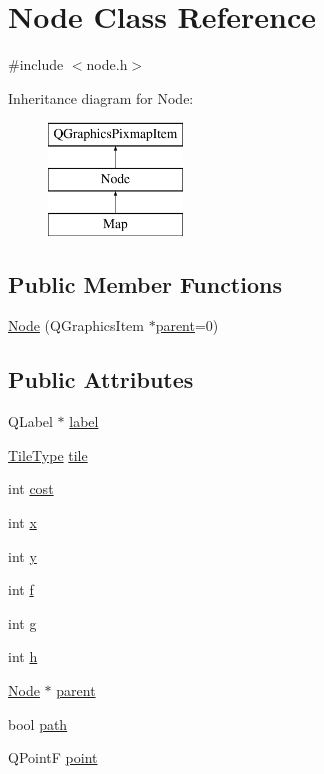 \hypertarget{class_node}{}\section{Node Class Reference}
\label{class_node}


{\ttfamily \#include $<$node.\+h$>$}

Inheritance diagram for Node\+:\begin{figure}[H]
\begin{center}
\leavevmode
\includegraphics[height=3.000000cm]{class_node}
\end{center}
\end{figure}
\subsection*{Public Member Functions}
\begin{DoxyCompactItemize}
\item 
\hyperlink{class_node_a99ae3b67742635b847aff323ddd29b62}{Node} (Q\+Graphics\+Item $\ast$\hyperlink{class_node_ad8184598cdea70e4bbdfd76f2b0f9e85}{parent}=0)
\end{DoxyCompactItemize}
\subsection*{Public Attributes}
\begin{DoxyCompactItemize}
\item 
Q\+Label $\ast$ \hyperlink{class_node_a95d9b57b8efb3807c994314c3ff444b7}{label}
\item 
\hyperlink{node_8h_ac9e486ec80ccfdb28a4f4837d419c9f1}{Tile\+Type} \hyperlink{class_node_a2250e2c1710fb19f15f236ac69563613}{tile}
\item 
int \hyperlink{class_node_aae24f318bd4b6d14270084cec3fc98b5}{cost}
\item 
int \hyperlink{class_node_aff1029a518bdc2651007b8856f958364}{x}
\item 
int \hyperlink{class_node_aa3e5b5240023b4528ae85057b3324202}{y}
\item 
int \hyperlink{class_node_a32fbe9e0f4fc9e9d1845ce808738d7ab}{f}
\item 
int \hyperlink{class_node_a0b249888eacdec6c623ec8c58b230c48}{g}
\item 
int \hyperlink{class_node_afb5a7ac7536a9e09488bb685420cd78a}{h}
\item 
\hyperlink{class_node}{Node} $\ast$ \hyperlink{class_node_ad8184598cdea70e4bbdfd76f2b0f9e85}{parent}
\item 
bool \hyperlink{class_node_a2bb1959485873369ea2504c1dece3f33}{path}
\item 
Q\+PointF \hyperlink{class_node_a77faa088c74e20a361a181b58e8a4c7f}{point}
\end{DoxyCompactItemize}


